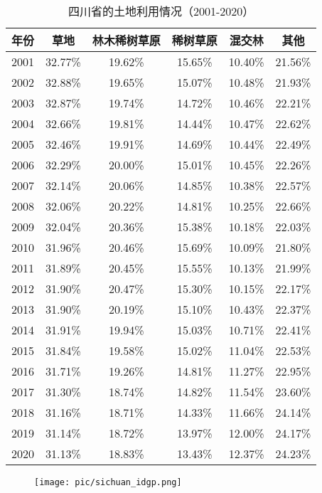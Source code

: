 \documentclass{article}
\begin{document}
		
		\begin{table}[H]
			\centering
			\begin{tabular}{|c|c|c|c|c|c|}
				\hline
				年份 & 草地 & 林木稀树草原 & 稀树草原 & 混交林 & 其他 \\
				\hline
				2001 & 32.77\% & 19.62\% & 15.65\% & 10.40\% & 21.56\% \\
				2002 & 32.88\% & 19.65\% & 15.07\% & 10.48\% & 21.93\% \\
				2003 & 32.87\% & 19.74\% & 14.72\% & 10.46\% & 22.21\% \\
				2004 & 32.66\% & 19.81\% & 14.44\% & 10.47\% & 22.62\% \\
				2005 & 32.46\% & 19.91\% & 14.69\% & 10.44\% & 22.49\% \\
				2006 & 32.29\% & 20.00\% & 15.01\% & 10.45\% & 22.26\% \\
				2007 & 32.14\% & 20.06\% & 14.85\% & 10.38\% & 22.57\% \\
				2008 & 32.06\% & 20.22\% & 14.81\% & 10.25\% & 22.66\% \\
				2009 & 32.04\% & 20.36\% & 15.38\% & 10.18\% & 22.03\% \\
				2010 & 31.96\% & 20.46\% & 15.69\% & 10.09\% & 21.80\% \\
				2011 & 31.89\% & 20.45\% & 15.55\% & 10.13\% & 21.99\% \\
				2012 & 31.90\% & 20.47\% & 15.30\% & 10.15\% & 22.17\% \\
				2013 & 31.90\% & 20.19\% & 15.10\% & 10.43\% & 22.37\% \\
				2014 & 31.91\% & 19.94\% & 15.03\% & 10.71\% & 22.41\% \\
				2015 & 31.84\% & 19.58\% & 15.02\% & 11.04\% & 22.53\% \\
				2016 & 31.71\% & 19.26\% & 14.81\% & 11.27\% & 22.95\% \\
				2017 & 31.30\% & 18.74\% & 14.82\% & 11.54\% & 23.60\% \\
				2018 & 31.16\% & 18.71\% & 14.33\% & 11.66\% & 24.14\% \\
				2019 & 31.14\% & 18.72\% & 13.97\% & 12.00\% & 24.17\% \\
				2020 & 31.13\% & 18.83\% & 13.43\% & 12.37\% & 24.23\% \\
				\hline
			\end{tabular}
			\caption{四川省的土地利用情况（2001-2020）}
		\end{table}
		
						
		\begin{figure}[H]  %
			\centering
			\texttt{[image: pic/sichuan\_idgp.png]} %
		\end{figure}
		
\end{document}
